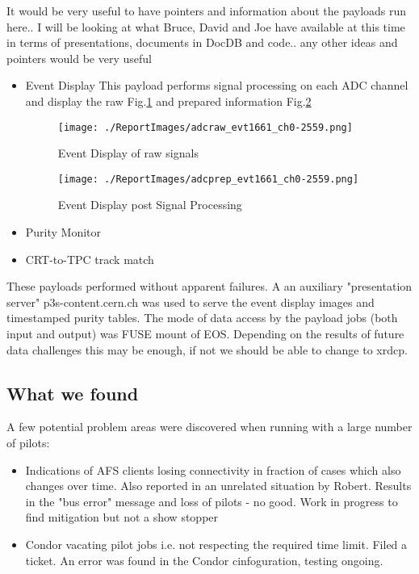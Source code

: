 \documentclass[pdftex,12pt,letter]{article}
\begin{document}
 \color{red} It would be very useful to have pointers and information about the payloads run here.. I will be looking at what Bruce, David and Joe have available at this time in terms of presentations, documents in DocDB and code.. any other ideas and  pointers would be very useful
 \color {black}
 
\begin{itemize}
\item Event Display
This payload performs signal processing on each ADC channel and display the raw Fig.\ref{fig:adcraw} and prepared information 
 Fig.\ref{fig:adcprep}

\begin{figure}[tbh]
  \centering
  \texttt{[image: ./ReportImages/adcraw\_evt1661\_ch0-2559.png]}
  \caption{Event Display of raw signals}
  \label{fig:adcraw}
\end{figure}


\begin{figure}[tbh]
  \centering
  \texttt{[image: ./ReportImages/adcprep\_evt1661\_ch0-2559.png]}
  \caption{Event Display post Signal Processing}
  \label{fig:adcprep}
\end{figure}

\item Purity Monitor
\item CRT-to-TPC track match
\end{itemize}
 


These payloads performed without apparent failures. A an auxiliary "presentation server" p3s-content.cern.ch was used to serve the event display images and timestamped purity tables.
The mode of data access by the payload jobs (both input and output) was FUSE mount of EOS. Depending on the results of future data challenges this may be enough, if not we should be able to change to xrdcp.
\subsection{What we found}
A few potential problem areas were discovered when running with a large number of pilots:
\begin{itemize}
\item Indications of AFS clients losing connectivity in fraction of cases which also changes over time. Also reported in an unrelated situation by Robert. Results in the "bus error" message and loss of pilots - no good. Work in progress to find mitigation but not a show stopper
\item Condor vacating pilot jobs i.e. not respecting the required time limit. Filed a ticket. An error was found in the Condor cinfoguration, testing ongoing.
\end{itemize}
\end{document}
